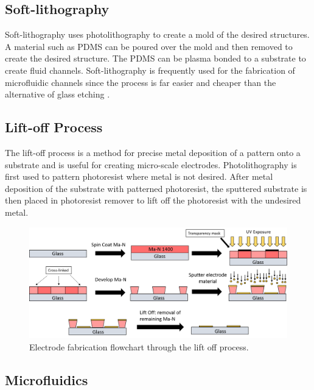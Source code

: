  
 \subsection*{Soft-lithography}
 
 \par Soft-lithography uses photolithography to create a mold of the desired structures. A material such as PDMS can be poured over the mold and then removed to create the desired structure. The PDMS can be plasma bonded to a substrate to create fluid channels. Soft-lithography is frequently used for the fabrication of microfluidic channels since the process is far easier and cheaper than the alternative of glass etching \cite{whitesides_soft_2001}.
 
 
 \subsection*{Lift-off Process}
 
 \par The lift-off process is a method for precise metal deposition of a pattern onto a substrate and is useful for creating micro-scale electrodes. Photolithography is first used to pattern photoresist where metal is not desired. After metal deposition of the substrate with patterned photoresist, the sputtered substrate is then placed in photoresist remover to lift off the photoresist with the undesired metal. 
 
 \begin{figure}
     \centering
     \includegraphics[width=\textwidth]{images/electrodeFabrication.png}
     \caption{Electrode fabrication flowchart through the lift off process.}
     \label{fig:lift_off}
 \end{figure}
 
 
 \subsection{Microfluidics}
 

